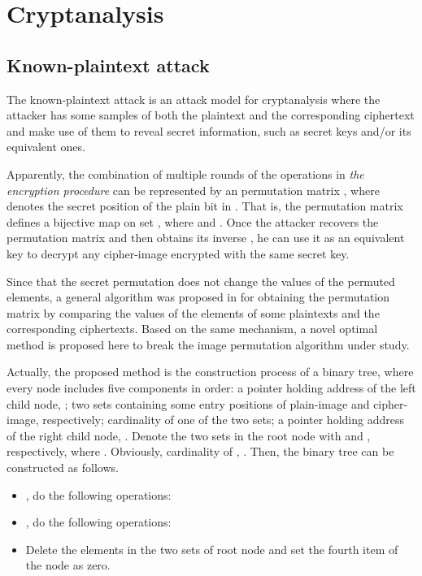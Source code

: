 \documentclass[3p,preprint,11pt]{elsarticle}
\begin{document}
\section{Cryptanalysis}
\label{sec:cryptanalysis}

\subsection{Known-plaintext attack}
\label{sec:KnownPlaintextAttack}

The known-plaintext attack is an attack model for cryptanalysis
where the attacker has some samples of both the plaintext and the
corresponding ciphertext and make use of them to reveal secret
information, such as secret keys and/or its equivalent ones.

Apparently, the combination of multiple rounds of the operations in
\textit{the encryption procedure} can be represented by an
 permutation matrix , where  denotes the secret position of the
plain bit  in . That is, the permutation
matrix  defines a bijective map on set , where  and
. Once the attacker recovers the
permutation matrix  and then obtains its inverse
, he can use it as an equivalent key to decrypt any
cipher-image encrypted with the same secret key.

Since that the secret permutation does not change the
values of the permuted elements, a general algorithm was proposed in
\cite{Li:AttackingPOMC2008} for obtaining the permutation matrix by
comparing the values of the elements of some plaintexts and the
corresponding ciphertexts. Based on the same mechanism, a novel
optimal method is proposed here to break the image permutation
algorithm under study.

Actually, the proposed method is the construction process of a binary
tree, where every node includes five components in order: a pointer
holding address of the left child node, ; two sets containing
some entry positions of plain-image and cipher-image, respectively;
cardinality of one of the two sets; a pointer holding address of the
right child node, . Denote the two sets in the root node with
 and , respectively, where
. Obviously,
cardinality of , . Then, the binary
tree can be constructed as follows.

\begin{itemize}
\item , do the
following operations:



\item , do the
following operations:



\item Delete the elements in the two sets of root node and set the
fourth item of the node as zero.
\end{itemize}
\end{document}
